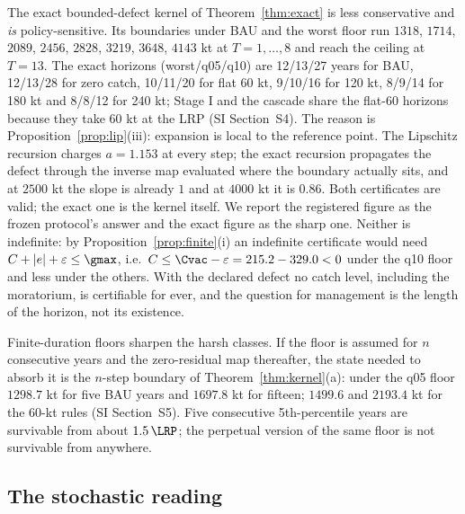 The exact bounded-defect kernel of Theorem~\ref{thm:exact} is less conservative and \emph{is} policy-sensitive. Its boundaries under BAU and the worst floor run $1318$, $1714$, $2089$, $2456$, $2828$, $3219$, $3648$, $4143$ kt at $T=1,\dots,8$ and reach the ceiling at $T=13$. The exact horizons (worst/q05/q10) are 12/13/27 years for BAU, 12/13/28 for zero catch, 10/11/20 for flat 60 kt, 9/10/16 for 120 kt, 8/9/14 for 180 kt and 8/8/12 for 240 kt; Stage I and the cascade share the flat-60 horizons because they take 60 kt at the LRP (SI Section~S4). The reason is Proposition~\ref{prop:lip}(iii): expansion is local to the reference point. The Lipschitz recursion charges $a=1.153$ at every step; the exact recursion propagates the defect through the inverse map evaluated where the boundary actually sits, and at $2500$ kt the slope is already $1$ and at $4000$ kt it is $0.86$. Both certificates are valid; the exact one is the kernel itself. We report the registered figure as the frozen protocol's answer and the exact figure as the sharp one. Neither is indefinite: by Proposition~\ref{prop:finite}(i) an indefinite certificate would need $C+|e|+\varepsilon\le\gmax$, i.e.\ $C\le\Cvac-\varepsilon=215.2-329.0<0$ under the q10 floor and less under the others. With the declared defect no catch level, including the moratorium, is certifiable for ever, and the question for management is the length of the horizon, not its existence.

Finite-duration floors sharpen the harsh classes. If the floor is assumed for $n$ consecutive years and the zero-residual map thereafter, the state needed to absorb it is the $n$-step boundary of Theorem~\ref{thm:kernel}(a): under the q05 floor $1298.7$ kt for five BAU years and $1697.8$ kt for fifteen; $1499.6$ and $2193.4$ kt for the 60-kt rules (SI Section~S5). Five consecutive 5th-percentile years are survivable from about $1.5\,\LRP$; the perpetual version of the same floor is not survivable from anywhere.

\subsection{The stochastic reading}\label{sec:cod-stoch}

